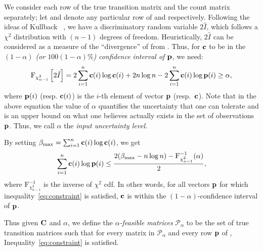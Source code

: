 We consider each row of the true transition matrix and the count matrix
separately; let {\rowp} and {\rowc} denote
any particular row of {\truetransitionmatrix} and {\countmatrix} respectively.  
Following the ideas of Kullback {\etal}~\cite{kullback62tests}, we have a discriminatory random variable $2\hat{I}$, which follows a $\chi^2$ distribution with $(n-1)$ degrees of freedom. Heuristically, $2\hat{I}$ can be considered as a measure of the ``divergence'' of {\rowc} from {\rowp}.
Thus, 
for $\mathbf{c}$ to be in the  \emph{$(1-\alpha)$ (or $100(1-\alpha)\%$) 
confidence interval of $\mathbf{p}$}, we need:
\begin{equation*}\label{eq:ul}
\text{F}_{\chi^2_{n-1}}\left[2\hat{I}\right] =  2\sum_{i=1}^n\mathbf{c}(i)\log\mathbf{c}(i)+2n\log n -2\sum_{i=1}^n\mathbf{c}(i)\log\mathbf{p}(i) \geq \alpha,
\end{equation*}
where 
 $\mathbf{p}(i)$ (resp. $\mathbf{c}(i)$) is the $i$-th element of vector $\mathbf{p}$ (resp.\ $\mathbf{c}$).
 Note that in the above equation the value of $\alpha$ quantifies the uncertainty that
 one can tolerate and is an upper bound on what one believes actually exists in the set of observations $\mathbf{p}$. 
Thus, we call $\alpha$ the \emph{input uncertainty level}.
 
By setting $\beta_\text{max} = \sum_{i=1}^n\mathbf{c}(i)\log \mathbf{c}(i)$,
we get
\begin{equation}\label{eq:constraint}
\sum_{i=1}^n\mathbf{c}(i)\log\mathbf{p}(i) \leq \frac{2(\beta_\text{max}-n\log n)-\text{F}^{-1}_{\chi^2_{n-1}}(\alpha)}{2},
\end{equation}
where $\text{F}^{-1}_{\chi^2_{n-1}}$ is the inverse of $\chi^2$ cdf. 
In other words, for all vectors $\mathbf{p}$ for which inequality~\eqref{eq:constraint}
is satisfied, $\mathbf{c}$ is within the $(1-\alpha)$-confidence interval of $\mathbf{p}$.

Thus given ${\mathbf{C}}$ and $\alpha$, we define 
the \emph{$\alpha$-feasible
matrices} $\mathcal{P}_{\alpha}$ to be 
the 
set of true transition matrices  such that
for every matrix {\truetransitionmatrix} in $\mathcal{P}_{\alpha}$
and every row $\mathbf{p}$ of {\truetransitionmatrix}, Inequality~\eqref{eq:constraint}
is satisfied.



